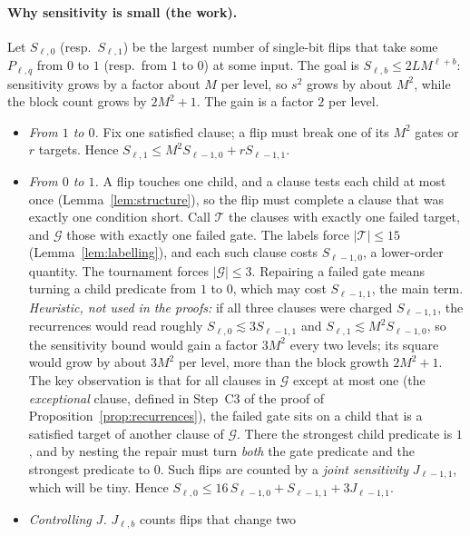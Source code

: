 \documentclass[11pt]{article}
\theoremstyle{definition}
\theoremstyle{remark}
\begin{document}
\paragraph{Why sensitivity is small (the work).}
Let \(S_{\ell,0}\) (resp.\ \(S_{\ell,1}\)) be the largest number of single-bit
flips that take some \(P_{\ell,q}\) from \(0\) to \(1\) (resp.\ from \(1\) to
\(0\)) at some input. The goal is \(S_{\ell,b}\le 2LM^{\ell+b}\): sensitivity
grows by a factor about \(M\) per level, so \(s^2\) grows by about \(M^2\),
while the block count grows by \(2M^2+1\). The gain is a factor \(2\) per
level.
\begin{itemize}[leftmargin=1.5em]
\item \emph{From \(1\) to \(0\).} Fix one satisfied clause; a flip must break
 one of its \(M^2\) gates or \(r\) targets. Hence
 \(S_{\ell,1}\le M^2S_{\ell-1,0}+rS_{\ell-1,1}\).
\item \emph{From \(0\) to \(1\).} A flip touches one child, and a clause
 tests each child at most once (Lemma~\ref{lem:structure}), so the flip must
 complete a clause that was exactly one condition short. Call
 \(\mathcal T\) the clauses with exactly one failed target, and
 \(\mathcal G\) those with exactly one failed gate. The labels force
 \(|\mathcal T|\le 15\) (Lemma~\ref{lem:labelling}), and each such clause
 costs \(S_{\ell-1,0}\), a lower-order quantity. The tournament forces
 \(|\mathcal G|\le3\). Repairing a failed gate means turning a child
 predicate from \(1\) to \(0\), which may cost \(S_{\ell-1,1}\), the main
 term. \emph{Heuristic, not used in the proofs:} if all three clauses were
 charged \(S_{\ell-1,1}\), the recurrences would read roughly
 \(S_{\ell,0}\lesssim3S_{\ell-1,1}\) and \(S_{\ell,1}\lesssim M^2S_{\ell-1,0}\),
 so the sensitivity bound would gain a factor \(3M^2\) every two levels; its
 square would grow by about \(3M^2\) per level, more than the block growth
 \(2M^2+1\). The key observation is that for all
 clauses in \(\mathcal G\) except at most one (the \emph{exceptional}
 clause, defined in Step~C3 of the proof of
 Proposition~\ref{prop:recurrences}), the failed gate sits on a child that
 is a satisfied target of another clause of \(\mathcal G\). There the
 strongest child predicate is \(1\), and by nesting the repair must turn
 \emph{both} the gate predicate and the strongest predicate to \(0\). Such
 flips are counted by a \emph{joint sensitivity} \(J_{\ell-1,1}\), which will
 be tiny. Hence
 \(S_{\ell,0}\le 16\,S_{\ell-1,0}+S_{\ell-1,1}+3J_{\ell-1,1}\).
\item \emph{Controlling \(J\).} \(J_{\ell,b}\) counts flips that change two

\end{itemize}
\end{document}
